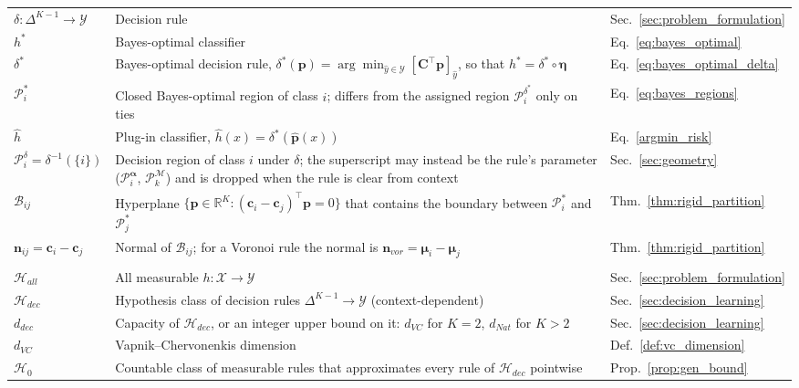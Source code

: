{\begin{longtable}{@{}l >{\raggedright\arraybackslash}p{8cm} l@{}}
$\delta \colon \Delta^{K-1} \to \mathcal{Y}$ & Decision rule & Sec.~\ref{sec:problem_formulation} \\
$h^*$ & Bayes-optimal classifier & Eq.~\eqref{eq:bayes_optimal} \\
$\delta^*$ & Bayes-optimal decision rule, $\delta^*(\mathbf{p}) = \arg\min_{\hat y \in \mathcal{Y}} [\mathbf{C}^\top \mathbf{p}]_{\hat y}$, so that $h^* = \delta^* \circ \boldsymbol{\eta}$ & Eq.~\eqref{eq:bayes_optimal_delta} \\
$\mathcal{P}_i^*$ & Closed Bayes-optimal region of class $i$; differs from the assigned region $\mathcal{P}_i^{\delta^*}$ only on ties & Eq.~\eqref{eq:bayes_regions} \\
$\hat h$ & Plug-in classifier, $\hat h(x) = \delta^*(\hat{\mathbf{p}}(x))$ & Eq.~\eqref{argmin_risk} \\
$\mathcal{P}_i^\delta = \delta^{-1}(\{i\})$ & Decision region of class $i$ under $\delta$; the superscript may instead be the rule's parameter ($\mathcal{P}_i^{\boldsymbol{\alpha}}$, $\mathcal{P}_k^{\mathcal{M}}$) and is dropped when the rule is clear from context & Sec.~\ref{sec:geometry} \\
$\mathcal{B}_{ij}$ & Hyperplane $\{\mathbf{p} \in \mathbb{R}^K : (\mathbf{c}_i - \mathbf{c}_j)^\top \mathbf{p} = 0\}$ that contains the boundary between $\mathcal{P}_i^*$ and $\mathcal{P}_j^*$ & Thm.~\ref{thm:rigid_partition} \\
$\mathbf{n}_{ij} = \mathbf{c}_i - \mathbf{c}_j$ & Normal of $\mathcal{B}_{ij}$; for a Voronoi rule the normal is $\mathbf{n}_{vor} = \boldsymbol{\mu}_i - \boldsymbol{\mu}_j$ & Thm.~\ref{thm:rigid_partition} \\
\addlinespace
\multicolumn{3}{@{}l}{\textit{Generalization and capacity}}\\
\midrule
$\mathcal{H}_{all}$ & All measurable $h \colon \mathcal{X} \to \mathcal{Y}$ & Sec.~\ref{sec:problem_formulation} \\
$\mathcal{H}_{dec}$ & Hypothesis class of decision rules $\Delta^{K-1} \to \mathcal{Y}$ (context-dependent) & Sec.~\ref{sec:decision_learning} \\
$d_{dec}$ & Capacity of $\mathcal{H}_{dec}$, or an integer upper bound on it: $d_{VC}$ for $K = 2$, $d_{Nat}$ for $K > 2$ & Sec.~\ref{sec:decision_learning} \\
$d_{VC}$ & Vapnik--Chervonenkis dimension & Def.~\ref{def:vc_dimension} \\ %
$\mathcal{H}_0$ & Countable class of measurable rules that approximates every rule of $\mathcal{H}_{dec}$ pointwise & Prop.~\ref{prop:gen_bound} \\

\end{longtable}}
